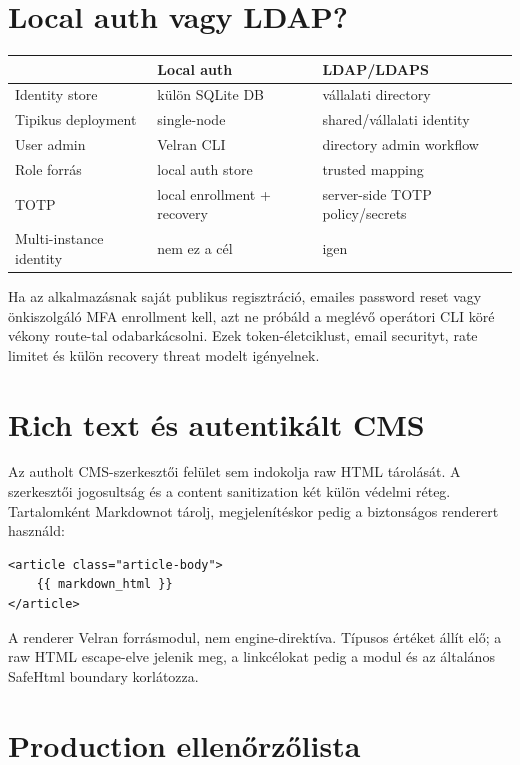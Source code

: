 \section{Local auth vagy LDAP?}

\begin{center}
\begin{tabularx}{\textwidth}{@{}lYY@{}}
\toprule
 & Local auth & LDAP/LDAPS \\
\midrule
Identity store & külön SQLite DB & vállalati directory \\
Tipikus deployment & single-node & shared/vállalati identity \\
User admin & Velran CLI & directory admin workflow \\
Role forrás & local auth store & trusted mapping \\
TOTP & local enrollment + recovery & server-side TOTP policy/secrets \\
Multi-instance identity & nem ez a cél & igen \\
\bottomrule
\end{tabularx}
\end{center}

Ha az alkalmazásnak saját publikus regisztráció, emailes password reset vagy önkiszolgáló MFA enrollment kell, azt ne próbáld a meglévő operátori CLI köré vékony route-tal odabarkácsolni. Ezek token-életciklust, email securityt, rate limitet és külön recovery threat modelt igényelnek.

\section{Rich text és autentikált CMS}

Az autholt CMS-szerkesztői felület sem indokolja raw HTML tárolását. A szerkesztői jogosultság és a content sanitization két külön védelmi réteg. Tartalomként Markdownot tárolj, megjelenítéskor pedig a biztonságos renderert használd:

\begin{lstlisting}[language=Velran]
<article class="article-body">
    {{ markdown_html }}
</article>
\end{lstlisting}

A renderer Velran forrásmodul, nem engine-direktíva. Típusos  értéket állít elő; a raw HTML escape-elve jelenik meg, a linkcélokat pedig a modul és az általános SafeHtml boundary korlátozza.

\section{Production ellenőrzőlista}

